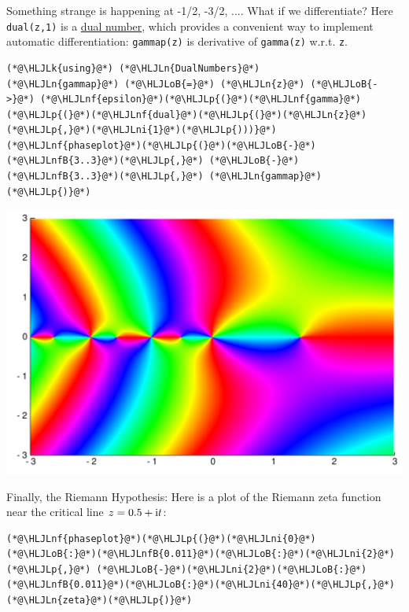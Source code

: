 \documentclass[12pt,a4paper]{article}
\newcommand{\HLJLk}[1]{\textcolor[RGB]{148,91,176}{\textbf{#1}}}
\newcommand{\HLJLn}[1]{#1}
\newcommand{\HLJLnf}[1]{\textcolor[RGB]{66,102,213}{#1}}
\newcommand{\HLJLnfB}[1]{\textcolor[RGB]{59,151,46}{#1}}
\newcommand{\HLJLni}[1]{\textcolor[RGB]{59,151,46}{#1}}
\newcommand{\HLJLoB}[1]{\textcolor[RGB]{102,102,102}{\textbf{#1}}}
\newcommand{\HLJLp}[1]{#1}
\def\I{ {\rm i} }
\begin{document}
Something strange is happening at -1/2, -3/2, .... What if we differentiate? Here \texttt{dual(z,1)} is a \href{https://en.wikipedia.org/wiki/Dual_number}{dual number}, which provides a convenient way to implement automatic differentiation: \texttt{gammap(z)} is derivative of \texttt{gamma(z)} w.r.t. \texttt{z}.


\begin{lstlisting}
(*@\HLJLk{using}@*) (*@\HLJLn{DualNumbers}@*)
(*@\HLJLn{gammap}@*) (*@\HLJLoB{=}@*) (*@\HLJLn{z}@*) (*@\HLJLoB{->}@*) (*@\HLJLnf{epsilon}@*)(*@\HLJLp{(}@*)(*@\HLJLnf{gamma}@*)(*@\HLJLp{(}@*)(*@\HLJLnf{dual}@*)(*@\HLJLp{(}@*)(*@\HLJLn{z}@*)(*@\HLJLp{,}@*)(*@\HLJLni{1}@*)(*@\HLJLp{)))}@*)
(*@\HLJLnf{phaseplot}@*)(*@\HLJLp{(}@*)(*@\HLJLoB{-}@*)(*@\HLJLnfB{3..3}@*)(*@\HLJLp{,}@*) (*@\HLJLoB{-}@*)(*@\HLJLnfB{3..3}@*)(*@\HLJLp{,}@*) (*@\HLJLn{gammap}@*)(*@\HLJLp{)}@*)
\end{lstlisting}

\includegraphics[width=\linewidth]{figures/Lecture1_16_1.pdf}

Finally, the Riemann Hypothesis: Here is a plot of the Riemann zeta function near the critical line $z = 0.5 + \I t$:


\begin{lstlisting}
(*@\HLJLnf{phaseplot}@*)(*@\HLJLp{(}@*)(*@\HLJLni{0}@*)(*@\HLJLoB{:}@*)(*@\HLJLnfB{0.011}@*)(*@\HLJLoB{:}@*)(*@\HLJLni{2}@*)(*@\HLJLp{,}@*) (*@\HLJLoB{-}@*)(*@\HLJLni{2}@*)(*@\HLJLoB{:}@*)(*@\HLJLnfB{0.011}@*)(*@\HLJLoB{:}@*)(*@\HLJLni{40}@*)(*@\HLJLp{,}@*) (*@\HLJLn{zeta}@*)(*@\HLJLp{)}@*)
\end{lstlisting}
\end{document}
